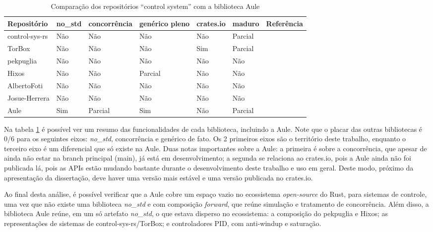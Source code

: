 \begin{table}[ht]
  \centering
  \caption{Comparação dos repositórios ``control system'' com a biblioteca Aule}
  \label{tab:lib-comp}
  \begin{tabularx}{\textwidth}{>{\hsize=1.3\hsize}X >{\hsize=0.85\hsize}X >{\hsize=1.1\hsize}X >{\hsize=1.1\hsize}X >{\hsize=0.9\hsize}X >{\hsize=0.9\hsize}X >{\hsize=0.85\hsize}X}
    \toprule
    Repositório & no\_std & concorrência & genérico pleno & crates.io & maduro & Referência \\
    \midrule
    control-sys-rs & Não & Não & Não & Não & Parcial & \citep{control-sys-rs} \\
    TorBox & Não & Não & Não & Sim & Parcial & \citep{torbox} \\
    pekpuglia & Não & Não & Não & Não & Não & \citep{pekpuglia} \\
    Hixos & Não & Não & Parcial & Não & Não & \citep{hixos} \\
    AlbertoFoti & Não & Não & Não & Não & Não & \citep{albertofoti} \\
    Josue-Herrera & Não & Não & Não & Não & Não & \citep{josue-herrera} \\
    Aule & Sim & Parcial & Sim & Não & Parcial & \citep{aule} \\
    \bottomrule
  \end{tabularx}
\end{table}

Na tabela \ref{tab:lib-comp} é possível ver um resumo das funcionalidades de cada biblioteca, incluindo a Aule. Note que o placar das outras bibliotecas é 0/6 para os seguintes eixos: \textit{no\_std}, concorrência e genérico de fato. Os 2 primeiros eixos são o território deste trabalho, enquanto o terceiro eixo é um diferencial que só existe na Aule. Duas notas importantes sobre a Aule: a primeira é sobre a concorrência, que apesar de ainda não estar na branch principal (main), já está em desenvolvimento; a segunda se relaciona ao crates.io, pois a Aule ainda não foi publicada lá, pois as \acp{API} estão mudando bastante durante o desenvolvimento deste trabalho e uso em geral. Deste modo, próximo da apresentação da dissertação, deve haver uma versão mais estável e uma versão publicada no crates.io.

Ao final desta análise, é possível verificar que a Aule cobre um espaço vazio no ecossistema \textit{open-source} do Rust, para sistemas de controle, uma vez que não existe uma biblioteca \textit{no\_std} e com composição \textit{forward}, que reúne simulação e tratamento de concorrência. Além disso, a biblioteca Aule reúne, em um só artefato \textit{no\_std}, o que estava disperso no ecossistema: a composição do pekpuglia e Hixos; as representações de sistemas de control-sys-rs/TorBox; e controladores \ac{PID}, com anti-windup e saturação.

